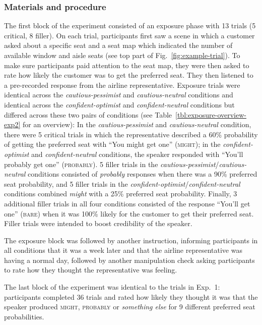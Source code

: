 \documentclass[man,floatsintext]{apa6}
\begin{document}
\subsubsection{Materials and procedure}

The first block of the experiment consisted of an exposure phase with 13 trials (5 critical, 8 filler). On each trial, participants first saw a scene in which a customer asked about a specific seat and a seat map which indicated the number of available window and aisle seats (see top part of Fig.~\ref{fig:example-trial}). To make sure participants paid attention to the seat map, they were then asked to rate how likely the customer  was to get the preferred seat. They then listened to a pre-recorded response from the airline representative. Exposure trials were identical across the \textit{cautious-pessimist} and \textit{cautious-neutral} conditions and identical across the \textit{confident-optimist} and \textit{confident-neutral} conditions but differed across these two pairs of conditions (see Table~\ref{tbl:exposure-overview-exp2} for an overview): In the \textit{cautious-pessimist} and \textit{cautious-neutral} condition, there were 5 critical trials in which the representative described a 60\% probability of getting the preferred seat with ``You might get one'' (\textsc{might}); in the \textit{confident-optimist} and \textit{confident-neutral} conditions, the speaker responded with ``You'll probably get one'' (\textsc{probably}). 5 filler trials in the \textit{cautious-pessimist}/\textit{cautious-neutral} conditions consisted of \textit{probably} responses   when there was a 90\% preferred seat probability, and 5 filler trials in the \textit{confident-optimist}/\textit{confident-neutral} conditions combined \textit{might} with a 25\% preferred seat  probability. Finally, 3 additional filler trials in all four conditions consisted of the response ``You'll get one'' (\textsc{bare}) when it was 100\% likely for the customer to get their preferred seat. Filler trials were intended to boost credibility of the speaker.

The exposure block was followed by another instruction, informing participants in all conditions that it was a week later and that the airline representative was having a normal day, followed by another manipulation check asking participants to rate how they thought the representative was feeling. 

The last block of the experiment was identical to the trials in Exp.~1: participants completed 36 trials and rated how likely they thought it was that the speaker produced \textsc{might}, \textsc{probably} or \textit{something else} for 9 different preferred seat probabilities.
\end{document}
